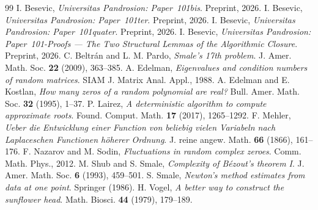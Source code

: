\documentclass[11pt,a4paper]{article}
\begin{document}
\begin{thebibliography}{99}
 I. Besevic, \textit{Universitas Pandrosion: Paper~101bis}. Preprint, 2026.
 I. Besevic, \textit{Universitas Pandrosion: Paper~101ter}. Preprint, 2026.
 I. Besevic, \textit{Universitas Pandrosion: Paper~101quater}. Preprint, 2026.
 I. Besevic, \textit{Universitas Pandrosion: Paper~101-Proofs --- The Two Structural Lemmas of the Algorithmic Closure}. Preprint, 2026.
 C. Beltr\'an and L. M. Pardo, \textit{Smale's 17th problem}. J. Amer. Math. Soc. \textbf{22} (2009), 363--385.
 A. Edelman, \textit{Eigenvalues and condition numbers of random matrices}. SIAM J. Matrix Anal. Appl., 1988.
 A. Edelman and E. Kostlan, \textit{How many zeros of a random polynomial are real?} Bull. Amer. Math. Soc. \textbf{32} (1995), 1--37.
 P. Lairez, \textit{A deterministic algorithm to compute approximate roots}. Found. Comput. Math. \textbf{17} (2017), 1265--1292.
 F. Mehler, \textit{Ueber die Entwicklung einer Function von beliebig vielen Variabeln nach Laplaceschen Functionen h\"oherer Ordnung}. J. reine angew. Math. \textbf{66} (1866), 161--176.
 F. Nazarov and M. Sodin, \textit{Fluctuations in random complex zeroes}. Comm. Math. Phys., 2012.
 M. Shub and S. Smale, \textit{Complexity of B\'ezout's theorem I}. J. Amer. Math. Soc. \textbf{6} (1993), 459--501.
 S. Smale, \textit{Newton's method estimates from data at one point}. Springer (1986).
 H. Vogel, \textit{A better way to construct the sunflower head}. Math. Biosci. \textbf{44} (1979), 179--189.
\end{thebibliography}
\end{document}
